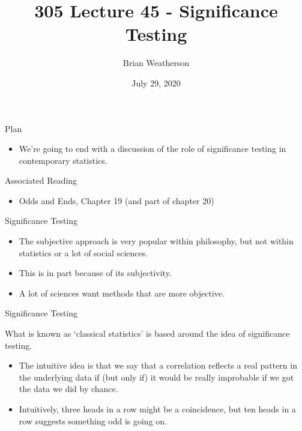 \documentclass[
  ignorenonframetext,
]{beamer}
\title{305 Lecture 45 - Significance Testing}
\author{Brian Weatherson}
\date{July 29, 2020}
\providecommand{\tightlist}{%
  \setlength{\itemsep}{0pt}\setlength{\parskip}{0pt}}
\renewcommand{\,}{\text{, }}
\begin{document}
\frame{\titlepage}

\begin{frame}{Plan}
\protect\hypertarget{plan}{}

\begin{itemize}
\tightlist
\item
  We're going to end with a discussion of the role of significance
  testing in contemporary statistics.
\end{itemize}

\end{frame}

\begin{frame}{Associated Reading}
\protect\hypertarget{associated-reading}{}

\begin{itemize}
\tightlist
\item
  Odds and Ends, Chapter 19 (and part of chapter 20)
\end{itemize}

\end{frame}

\begin{frame}{Significance Testing}
\protect\hypertarget{significance-testing}{}

\begin{itemize}
\tightlist
\item
  The subjective approach is very popular within philosophy, but not
  within statistics or a lot of social sciences.
\item
  This is in part because of its subjectivity.
\item
  A lot of sciences want methods that are more objective.
\end{itemize}

\end{frame}

\begin{frame}{Significance Testing}
\protect\hypertarget{significance-testing-1}{}

What is known as `classical statistics' is based around the idea of
significance testing.

\begin{itemize}
\tightlist
\item
  The intuitive idea is that we say that a correlation reflects a real
  pattern in the underlying data if (but only if) it would be really
  improbable if we got the data we did by chance.
\item
  Intuitively, three heads in a row might be a coincidence, but ten
  heads in a row suggests something odd is going on.
\end{itemize}

\end{frame}
\end{document}
